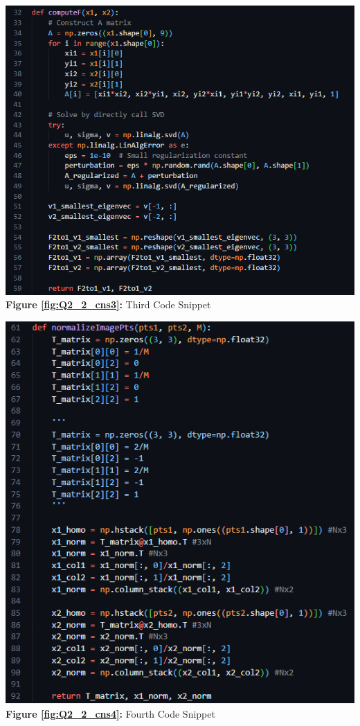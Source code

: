 \newpage
\begin{your_solution}[title=Q2.2 continued,height=10.0cm,width=\linewidth]
\begin{minipage}{0.48\linewidth}
	\centering
	\includegraphics[width=\linewidth]{../Q2_2_cns3.png}
	\textbf{Figure \ref{fig:Q2_2_cns3}:} Third Code Snippet  %
	\label{fig:Q2_2_cns3}         %
\end{minipage}
\hfill
\begin{minipage}{0.48\linewidth}
	\centering
	\includegraphics[width=\linewidth]{../Q2_2_cns4.png}
	\textbf{Figure \ref{fig:Q2_2_cns4}:} Fourth Code Snippet  %
	\label{fig:Q2_2_cns4}         %
\end{minipage}
\end{your_solution}
